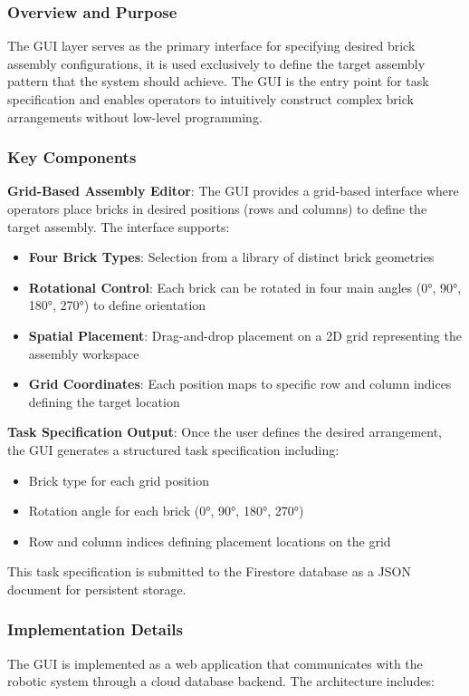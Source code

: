 \subsubsection{Overview and Purpose}
The GUI layer serves as the primary interface for specifying desired brick assembly configurations, it is used exclusively to define the target assembly pattern that the system should achieve. The GUI is the entry point for task specification and enables operators to intuitively construct complex brick arrangements without low-level programming.

\subsubsection{Key Components}

\textbf{Grid-Based Assembly Editor}: The GUI provides a grid-based interface where operators place bricks in desired positions (rows and columns) to define the target assembly. The interface supports:
\begin{itemize}
    \item \textbf{Four Brick Types}: Selection from a library of distinct brick geometries
    \item \textbf{Rotational Control}: Each brick can be rotated in four main angles (0°, 90°, 180°, 270°) to define orientation
    \item \textbf{Spatial Placement}: Drag-and-drop placement on a 2D grid representing the assembly workspace
    \item \textbf{Grid Coordinates}: Each position maps to specific row and column indices defining the target location
\end{itemize}

\textbf{Task Specification Output}: Once the user defines the desired arrangement, the GUI generates a structured task specification including:
\begin{itemize}
    \item Brick type for each grid position
    \item Rotation angle for each brick (0°, 90°, 180°, 270°)
    \item Row and column indices defining placement locations on the grid
\end{itemize}

This task specification is submitted to the Firestore database as a JSON document for persistent storage.

\subsubsection{Implementation Details}
The GUI is implemented as a web application that communicates with the robotic system through a cloud database backend. The architecture includes:

